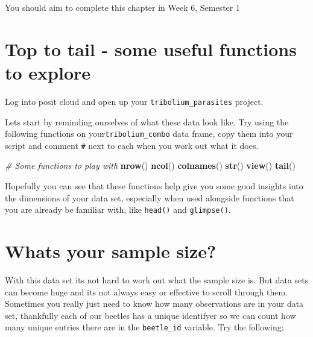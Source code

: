 \documentclass[
]{book}
\newenvironment{Shaded}{\begin{snugshade}}{\end{snugshade}}
\newcommand{\CommentTok}[1]{\textcolor[rgb]{0.56,0.35,0.01}{\textit{#1}}}
\newcommand{\FunctionTok}[1]{\textcolor[rgb]{0.13,0.29,0.53}{\textbf{#1}}}
\newcommand{\NormalTok}[1]{#1}
\newcommand{\SpecialCharTok}[1]{\textcolor[rgb]{0.81,0.36,0.00}{\textbf{#1}}}
\begin{document}
You should aim to complete this chapter in Week 6, Semester 1

\hypertarget{top-to-tail---some-useful-functions-to-explore}{%
\section{Top to tail - some useful functions to explore}\label{top-to-tail---some-useful-functions-to-explore}}

Log into posit cloud and open up your \texttt{tribolium\_parasites} project.

Lets start by reminding ourselves of what these data look like. Try using the following functions on your\texttt{tribolium\_combo} data frame, copy them into your script and comment \texttt{\#} next to each when you work out what it does.

\begin{Shaded}
\begin{Highlighting}[]
\CommentTok{\# Some functions to play with}
\FunctionTok{nrow}\NormalTok{()}
\FunctionTok{ncol}\NormalTok{()}
\FunctionTok{colnames}\NormalTok{()}
\FunctionTok{str}\NormalTok{()}
\FunctionTok{view}\NormalTok{()}
\FunctionTok{tail}\NormalTok{()}
\end{Highlighting}
\end{Shaded}

Hopefully you can see that these functions help give you some good insights into the dimensions of your data set, especially when used alongside functions that you are already be familiar with, like \texttt{head()} and \texttt{glimpse()}.

\hypertarget{whats-your-sample-size}{%
\section{Whats your sample size?}\label{whats-your-sample-size}}

With this data set its not hard to work out what the sample size is. But data sets can become huge and its not always easy or effective to scroll through them. Sometimes you really just need to know how many observations are in your data set, thankfully each of our beetles has a unique identifyer so we can count how many unique entries there are in the \texttt{beetle\_id} variable. Try the following;

\begin{Shaded}
\end{Shaded}
\end{document}
